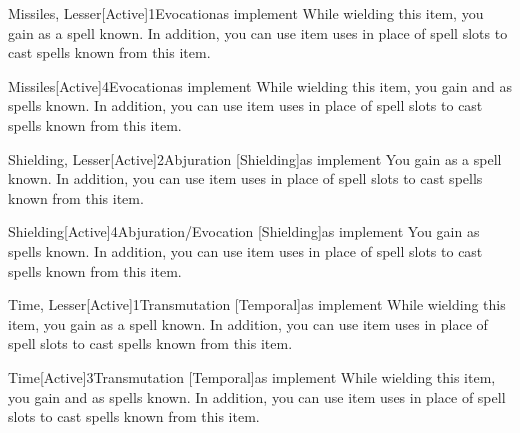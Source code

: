         \begin{magicitemdef}[Arcane]{Missiles, Lesser}[Active]{1}{Evocation}{as implement}
             While wielding this item, you gain  as a spell known.
            In addition, you can use item uses in place of spell slots to cast spells known from this item.
        \end{magicitemdef}

        \begin{magicitemdef}[Arcane]{Missiles}[Active]{4}{Evocation}{as implement}
             While wielding this item, you gain  and  as spells known.
            In addition, you can use item uses in place of spell slots to cast spells known from this item.
        \end{magicitemdef}

        \begin{magicitemdef}{Shielding, Lesser}[Active]{2}{Abjuration [Shielding]}{as implement}
             You gain  as a spell known.
            In addition, you can use item uses in place of spell slots to cast spells known from this item.
        \end{magicitemdef}

        \begin{magicitemdef}{Shielding}[Active]{4}{Abjuration/Evocation [Shielding]}{as implement}
             You gain  as spells known.
            In addition, you can use item uses in place of spell slots to cast spells known from this item.
        \end{magicitemdef}

        \begin{magicitemdef}[Arcane]{Time, Lesser}[Active]{1}{Transmutation [Temporal]}{as implement}
             While wielding this item, you gain  as a spell known.
            In addition, you can use item uses in place of spell slots to cast spells known from this item.
        \end{magicitemdef}

        \begin{magicitemdef}[Arcane]{Time}[Active]{3}{Transmutation [Temporal]}{as implement}
             While wielding this item, you gain  and  as spells known.
            In addition, you can use item uses in place of spell slots to cast spells known from this item.
        \end{magicitemdef}

